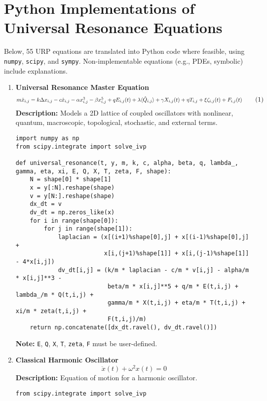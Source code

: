 \documentclass[12pt]{article}
\begin{document}
\section*{Python Implementations of Universal Resonance Equations}

Below, 55 URP equations are translated into Python code where feasible, using \texttt{numpy}, \texttt{scipy}, and \texttt{sympy}. Non-implementable equations (e.g., PDEs, symbolic) include explanations.

\begin{enumerate}
   \item \textbf{Universal Resonance Master Equation}
   \[
    \resizebox{\textwidth}{!}{$
   m \ddot{x}_{i,j} = k \Delta x_{i,j} - c \dot{x}_{i,j} - \alpha x_{i,j}^3 - \beta x_{i,j}^5 + q E_{i,j}(t) + \lambda \langle \hat{Q}_{i,j} \rangle + \gamma X_{i,j}(t) + \eta T_{i,j} + \xi \zeta_{i,j}(t) + F_{i,j}(t)
   $} \tag{1}
  \]
    \textbf{Description:} Models a 2D lattice of coupled oscillators with nonlinear, quantum, macroscopic, topological, stochastic, and external terms.
    \begin{lstlisting}
import numpy as np
from scipy.integrate import solve_ivp

def universal_resonance(t, y, m, k, c, alpha, beta, q, lambda_, gamma, eta, xi, E, Q, X, T, zeta, F, shape):
    N = shape[0] * shape[1]
    x = y[:N].reshape(shape)
    v = y[N:].reshape(shape)
    dx_dt = v
    dv_dt = np.zeros_like(x)
    for i in range(shape[0]):
        for j in range(shape[1]):
            laplacian = (x[(i+1)%shape[0],j] + x[(i-1)%shape[0],j] + 
                         x[i,(j+1)%shape[1]] + x[i,(j-1)%shape[1]] - 4*x[i,j])
            dv_dt[i,j] = (k/m * laplacian - c/m * v[i,j] - alpha/m * x[i,j]**3 - 
                          beta/m * x[i,j]**5 + q/m * E(t,i,j) + lambda_/m * Q(t,i,j) + 
                          gamma/m * X(t,i,j) + eta/m * T(t,i,j) + xi/m * zeta(t,i,j) + 
                          F(t,i,j)/m)
    return np.concatenate([dx_dt.ravel(), dv_dt.ravel()])
    \end{lstlisting}
    \textbf{Note:} \texttt{E}, \texttt{Q}, \texttt{X}, \texttt{T}, \texttt{zeta}, \texttt{F} must be user-defined.

    \item \textbf{Classical Harmonic Oscillator}
    \[
    \ddot{x}(t) + \omega^2 x(t) = 0 \tag{2}
    \]
    \textbf{Description:} Equation of motion for a harmonic oscillator.
    \begin{lstlisting}
from scipy.integrate import solve_ivp


\end{lstlisting}
\end{enumerate}
\end{document}
